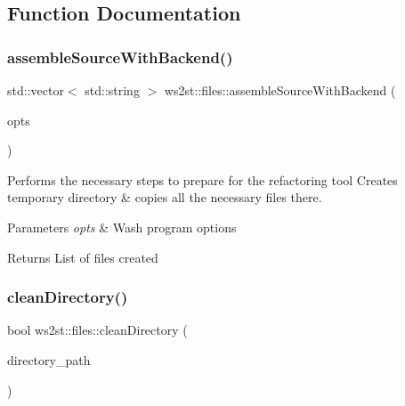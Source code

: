 \subsection{Function Documentation}
\mbox{\label{namespacews2st_1_1files_a10984d26ef2edd156ea7c1a81359349a}} 
\subsubsection{\texorpdfstring{assemble\+Source\+With\+Backend()}{assembleSourceWithBackend()}}
{\footnotesize\ttfamily std\+::vector$<$ std\+::string $>$ ws2st\+::files\+::assemble\+Source\+With\+Backend (\begin{DoxyParamCaption}\item[{\mbox{\hyperlink{structWashOptions}{Wash\+Options}} \&}]{opts }\end{DoxyParamCaption})}



Performs the necessary steps to prepare for the refactoring tool Creates temporary directory \& copies all the necessary files there. 


\begin{DoxyParams}{Parameters}
{\em opts} & Wash program options \\
\hline
\end{DoxyParams}
\begin{DoxyReturn}{Returns}
List of files created 
\end{DoxyReturn}
\mbox{\label{namespacews2st_1_1files_a0fed937b7498df1fb8980bc8150cc5b4}} 
\subsubsection{\texorpdfstring{clean\+Directory()}{cleanDirectory()}}
{\footnotesize\ttfamily bool ws2st\+::files\+::clean\+Directory (\begin{DoxyParamCaption}\item[{const fs\+::path \&}]{directory\+\_\+path }\end{DoxyParamCaption})}



